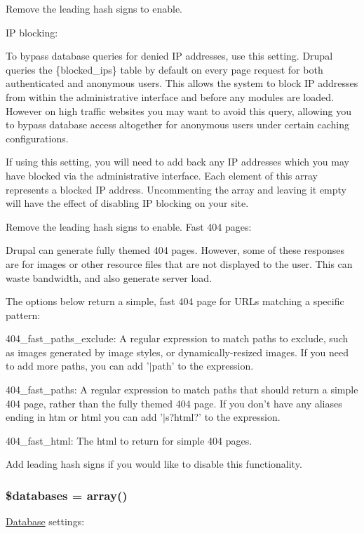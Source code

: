 Remove the leading hash signs to enable.

IP blocking:

To bypass database queries for denied IP addresses, use this setting. Drupal queries the \{blocked\_\-ips\} table by default on every page request for both authenticated and anonymous users. This allows the system to block IP addresses from within the administrative interface and before any modules are loaded. However on high traffic websites you may want to avoid this query, allowing you to bypass database access altogether for anonymous users under certain caching configurations.

If using this setting, you will need to add back any IP addresses which you may have blocked via the administrative interface. Each element of this array represents a blocked IP address. Uncommenting the array and leaving it empty will have the effect of disabling IP blocking on your site.

Remove the leading hash signs to enable. Fast 404 pages:

Drupal can generate fully themed 404 pages. However, some of these responses are for images or other resource files that are not displayed to the user. This can waste bandwidth, and also generate server load.

The options below return a simple, fast 404 page for URLs matching a specific pattern:
\begin{DoxyItemize}
\item 404\_\-fast\_\-paths\_\-exclude: A regular expression to match paths to exclude, such as images generated by image styles, or dynamically-\/resized images. If you need to add more paths, you can add '$|$path' to the expression.
\item 404\_\-fast\_\-paths: A regular expression to match paths that should return a simple 404 page, rather than the fully themed 404 page. If you don't have any aliases ending in htm or html you can add '$|$s?html?' to the expression.
\item 404\_\-fast\_\-html: The html to return for simple 404 pages.
\end{DoxyItemize}

Add leading hash signs if you would like to disable this functionality. \hypertarget{default_8settings_8php_a97cde67402a68697692531e8b067f86f}{
\subsubsection[{\$databases}]{\setlength{\rightskip}{0pt plus 5cm}\$databases = array()}}
\label{default_8settings_8php_a97cde67402a68697692531e8b067f86f}
\hyperlink{classDatabase}{Database} settings:

